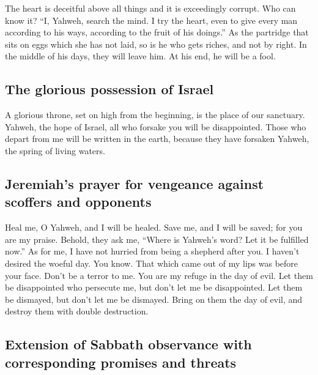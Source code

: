  The heart is deceitful above all things and it is
exceedingly corrupt. Who can know it?  ``I, Yahweh,
search the mind. I try the heart, even to give every man according to
his ways, according to the fruit of his doings.''  As the
partridge that sits on eggs which she has not laid, so is he who gets
riches, and not by right. In the middle of his days, they will leave
him. At his end, he will be a fool.

\hypertarget{the-glorious-possession-of-israel}{%
\subsection{The glorious possession of
Israel}\label{the-glorious-possession-of-israel}}

 A glorious throne, set on high from the beginning, is
the place of our sanctuary.  Yahweh, the hope of Israel,
all who forsake you will be disappointed. Those who depart from me will
be written in the earth, because they have forsaken Yahweh, the spring
of living waters.

\hypertarget{jeremiahs-prayer-for-vengeance-against-scoffers-and-opponents}{%
\subsection{Jeremiah's prayer for vengeance against scoffers and
opponents}\label{jeremiahs-prayer-for-vengeance-against-scoffers-and-opponents}}

 Heal me, O Yahweh, and I will be healed. Save me, and I
will be saved; for you are my praise.  Behold, they ask
me, ``Where is Yahweh's word? Let it be fulfilled now.'' 
As for me, I have not hurried from being a shepherd after you. I haven't
desired the woeful day. You know. That which came out of my lips was
before your face.  Don't be a terror to me. You are my
refuge in the day of evil.  Let them be disappointed who
persecute me, but don't let me be disappointed. Let them be dismayed,
but don't let me be dismayed. Bring on them the day of evil, and destroy
them with double destruction.

\hypertarget{extension-of-sabbath-observance-with-corresponding-promises-and-threats}{%
\subsection{Extension of Sabbath observance with corresponding promises
and
threats}\label{extension-of-sabbath-observance-with-corresponding-promises-and-threats}}

